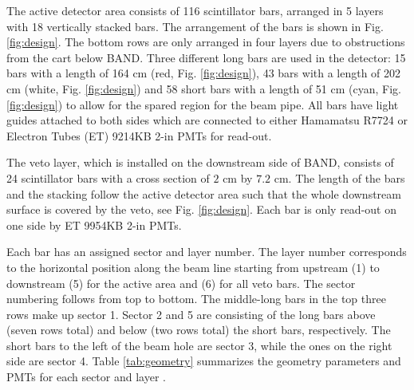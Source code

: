 \documentclass[3p,final,twocolumn]{elsarticle}
\begin{document}
The active detector area consists of 116 scintillator bars, arranged in 5 layers with 18 vertically stacked bars. The arrangement of the bars is shown in Fig. \ref{fig:design}. The bottom rows are only arranged in four layers due to obstructions from the cart below BAND.  Three different long bars are used in the detector: 15 bars with a length of 164 \si{\centi\meter} (red, Fig. \ref{fig:design}), 43 bars with a length of 202 \si{\centi\meter} (white, Fig. \ref{fig:design}) and 58 short bars with a length of 51 \si{\centi\meter} (cyan, Fig. \ref{fig:design}) to allow for the spared region for the beam pipe. All bars have light guides attached to both sides which are connected to either Hamamatsu R7724 \cite{pmtR7724} or Electron Tubes (ET) 9214KB \cite{pmt9214} 2-in PMTs for read-out.

The veto layer, which is installed on the downstream side of BAND, consists of 24 scintillator bars with a cross section of $2$ \si{\centi\meter} by $7.2$ \si{\centi\meter}. The length of the bars and the stacking follow the active detector area such that the whole downstream surface is covered by the veto, see Fig. \ref{fig:design}. Each bar is only read-out on one side by ET 9954KB \cite{pmt9954} 2-in PMTs.

Each bar has an assigned sector and layer number. The layer number corresponds to the horizontal position along the beam line starting from upstream (1) to downstream (5) for the active area and (6) for all veto bars. The sector numbering follows from top to bottom. The middle-long bars in the top three rows make up sector 1. Sector 2 and 5 are consisting of the long bars above (seven rows total) and below (two rows total) the short bars, respectively. The short bars to the left of the beam hole are sector 3, while the ones on the right side are sector 4. Table 
\ref{tab:geometry} summarizes the geometry parameters and PMTs for each sector and layer .
\end{document}
